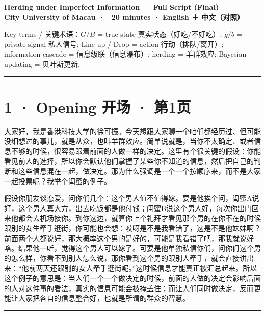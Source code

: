 \documentclass[11pt]{article}
\begin{document}
\begin{center}
{\LARGE\bfseries Herding under Imperfect Information — Full Script (Final)}\\[0.4em]
{\large \textbf{City University of Macau · ~20 minutes · English ＋ 中文（对照）}}\\[0.55em]
\end{center}

Key terms / 关键术语：\(G/B\) = true state 真实状态（好吃/不好吃）; \(g/b\) = private signal 私人信号; Line up / Drop = action 行动（排队/离开）; information cascade = 信息级联（信息瀑布）; herding = 羊群效应; Bayesian updating = 贝叶斯更新.\par

\vspace{0.35em}\noindent\rule{\textwidth}{0.3pt}\par

\section*{1 · Opening 开场 · 第1页}

大家好，我是香港科技大学的徐可振。今天想跟大家聊一个咱们都经历过、但可能没细想过的事儿，就是从众，也叫羊群效应。简单说就是，当你不太确定、或者信息不够的时候，很容易跟着前面的人做一样的决定。这里有个很关键的假设：你能看见前人的选择，所以你会默认他们掌握了某些你不知道的信息，然后把自己的判断和这些信息混在一起，做决定。那为什么强调是一个一个按顺序来，而不是大家一起投票呢？我举个闺蜜的例子。\par

假设你朋友谈恋爱，问你们几个：这个男人值不值得嫁。要是他挨个问，闺蜜A说好，这个男人真大方，出去吃饭都是他付钱；闺蜜B说这个男人好，每次你出门回来他都会去机场接你。到你这边，就算你上个礼拜才看见那个男的在你不在的时候跟别的女生牵手逛街，你可能也会想：哎呀是不是我看错了，这是不是他妹妹啊？前面两个人都说好，那大概率这个男的是好的，可能是我看错了吧，那我就说好咯。结果他一听，觉得这个男人可以嫁了。可要是他单独私信你们，问你们这个男的怎么样，你看不到别人怎么说，那你看到这个男的跟别人牵手，就会直接讲出来：“他前两天还跟别的女人牵手逛街呢。”这时候信息才能真正被汇总起来。所以这个例子的意思是：当人们一个一个做决定的时候，前面的人做的决定会影响后面的人对这件事的看法，真实的信息可能会被掩盖住；而让人们同时做决定，反而更能让大家把各自的信息整合好，也就是所谓的群众的智慧。\par

\vspace{0.35em}\noindent\rule{\textwidth}{0.3pt}\par
\end{document}

